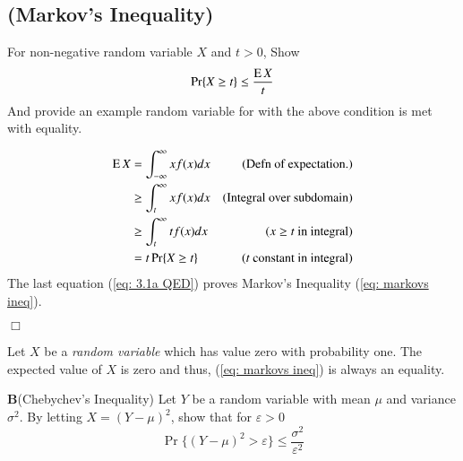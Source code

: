 \documentclass[10pt]{article}
\DeclareMathOperator*{\E}{\mbox{\text{E}}}
\newcommand{\pref}[1]{{(\ref{#1})}}
\begin{document}
\begin{tiny}
\begin{multicols}{3}


\section{(Markov's Inequality)}

 For non-negative random variable $X$ and  $t>0$,
Show
\begin{equation}
    \Pr\{X \geq t\} \leq \frac{\E X}{t} \label{eq: markovs ineq}
\end{equation}
And provide an example random variable for with the above condition is met
with equality. \proof

\begin{eqnarray}
    \E X &= \int_{-\infty}^\infty x f(x)dx &\text{(Defn of expectation.)}
        \nonumber \\
    &\geq \int_t^\infty x f(x)dx &\text{(Integral over subdomain)} 
        \nonumber \\
    &\geq \int_t^\infty t f(x)dx &\text{($x \geq t$ in integral)} 
        \nonumber \\
    &= t \Pr\{X \geq t\}  &\text{($t$ constant in integral)}
        \label{eq: 3.1a QED}
\end{eqnarray}
The last equation \pref{eq: 3.1a QED} proves Markov's Inequality
\pref{eq: markovs ineq}.

\begin{flushright}
    $\Box$
\end{flushright}

Let $X$ be a \emph{random variable} which has value zero with probability
one.
The expected value of $X$ is zero and thus, 
\pref{eq: markovs ineq} is always an equality.


\textbf{B}(Chebychev's Inequality) Let $Y$ be a random variable with mean $\mu$ and
variance $\sigma^2$. By letting $X = (Y-\mu)^2$, show that for
$\varepsilon > 0$
\begin{equation}
    \Pr \{(Y-\mu)^2 > \varepsilon\} \leq \frac{\sigma^2}{\varepsilon^2}
    \label{eq: chebychevs ineq}
\end{equation}

\proof


\end{multicols}
\end{tiny}
\end{document}
